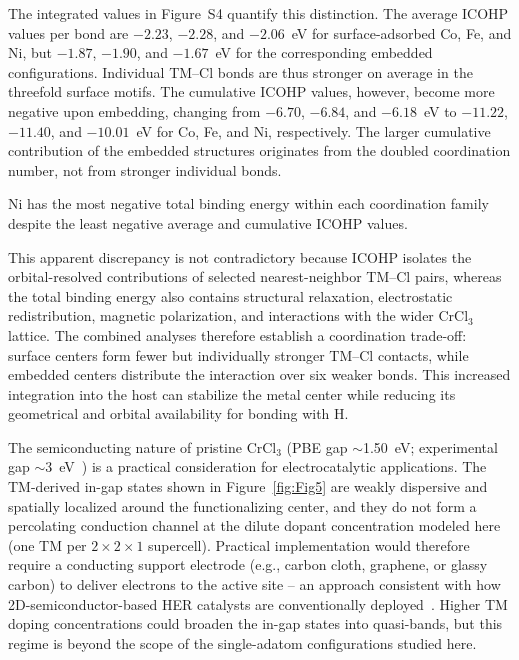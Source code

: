 \documentclass[journal=jacsat,manuscript=article]{achemso}
\begin{document}
The integrated values in Figure~S4 quantify this distinction. The average ICOHP values per bond are $-2.23$, $-2.28$, and $-2.06$~eV for surface-adsorbed Co, Fe, and Ni, but $-1.87$, $-1.90$, and $-1.67$~eV for the corresponding embedded configurations. Individual TM--Cl bonds are thus stronger on average in the threefold surface motifs. The cumulative ICOHP values, however, become more negative upon embedding, changing from $-6.70$, $-6.84$, and $-6.18$~eV to $-11.22$, $-11.40$, and $-10.01$~eV for Co, Fe, and Ni, respectively. The larger cumulative contribution of the embedded structures originates from the doubled coordination number, not from stronger individual bonds.

Ni has the most negative total binding energy within each coordination family despite the least negative average and cumulative ICOHP values.

This apparent discrepancy is not contradictory because ICOHP isolates the orbital-resolved contributions of selected nearest-neighbor TM--Cl pairs, whereas the total binding energy also contains structural relaxation, electrostatic redistribution, magnetic polarization, and interactions with the wider CrCl$_3$ lattice. The combined analyses therefore establish a coordination trade-off: surface centers form fewer but individually stronger TM--Cl contacts, while embedded centers distribute the interaction over six weaker bonds. This increased integration into the host can stabilize the metal center while reducing its geometrical and orbital availability for bonding with H.

{\color{revcolor}%
  The semiconducting nature of pristine CrCl$_3$ (PBE gap $\sim$1.50~eV; experimental gap $\sim$3~eV~\cite{Mastrippolito2021, Webster2018}) is a practical consideration for electrocatalytic applications. The TM-derived in-gap states shown in Figure~\ref{fig:Fig5} are weakly dispersive and spatially localized around the functionalizing center, and they do not form a percolating conduction channel at the dilute dopant concentration modeled here (one TM per $2\times2\times1$ supercell). Practical implementation would therefore require a conducting support electrode (e.g., carbon cloth, graphene, or glassy carbon) to deliver electrons to the active site -- an approach consistent with how 2D-semiconductor-based HER catalysts are conventionally deployed~\cite{Ipaves2025,Liao2022}. Higher TM doping concentrations could broaden the in-gap states into quasi-bands, but this regime is beyond the scope of the single-adatom configurations studied here.
\par}
\end{document}
